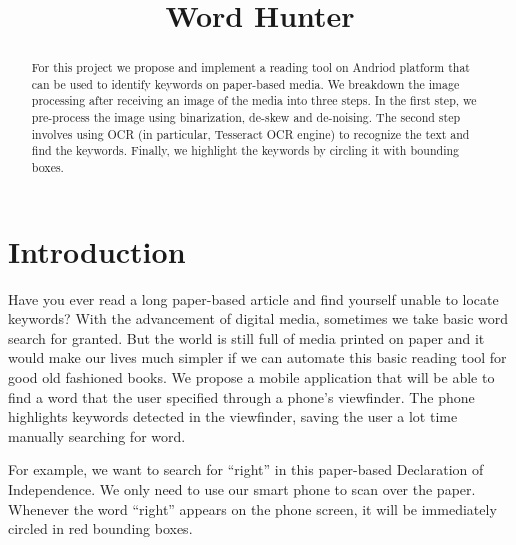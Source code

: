 \documentclass[conference]{IEEEtran}
\begin{document}
\title{Word Hunter}
\author{
}

\maketitle


\begin{abstract}
For this project we propose and implement a reading tool on Andriod platform that can be used to identify keywords on paper-based media.  We breakdown the image processing after receiving an image of the media into three steps.  In the first step, we pre-process the image using binarization, de-skew and de-noising.  The second step involves using OCR (in particular, Tesseract OCR engine) to recognize the text and find the keywords.  Finally, we highlight the keywords by circling it with bounding boxes.
\end{abstract}

\section{Introduction}
Have you ever read a long paper-based article and find yourself unable to locate keywords? With the advancement of digital media, sometimes we take basic word search for granted. But the world is still full of media printed on paper and it would make our lives much simpler if we can automate this basic reading tool for good old fashioned books. We propose a mobile application that will be able to find a word that the user specified through a phone's viewfinder. The phone highlights keywords detected in the viewfinder, saving the user a lot time manually searching for word. 

For example, we want to search for ``right'' in this paper-based Declaration of Independence. We only need to use our smart phone to scan over the paper. Whenever the word ``right'' appears on the phone screen, it will be immediately circled in red bounding boxes.\\
\end{document}
